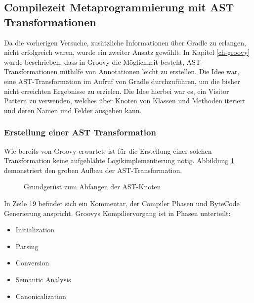 
\subsection{Compilezeit Metaprogrammierung mit AST Transformationen}
Da die vorherigen Versuche, zusätzliche Informationen über Gradle zu erlangen, nicht erfolgreich waren, wurde ein zweiter Ansatz gewählt. 
In Kapitel \ref{ch-groovy} wurde beschrieben, dass in Groovy die Möglichkeit besteht, AST-Transformationen mithilfe von Annotationen leicht zu erstellen. 
Die Idee war, eine AST-Transformation im Aufruf von Gradle durchzuführen, um die bisher nicht erreichten Ergebnisse zu erzielen. 
Die Idee hierbei war es, ein Visitor Pattern zu verwenden, welches über Knoten von Klassen und Methoden iteriert und deren Namen und Felder ausgeben kann. 


\subsubsection{Erstellung einer AST Transformation}
Wie bereits von Groovy erwartet, ist für die Erstellung einer solchen Transformation keine aufgeblähte Logikimplementierung nötig. 
Abbildung  \ref{fig:GlobalAst-visit} demonstriert den groben Aufbau der AST-Transformation.


\begin{figure}[hbt!]
	
	\caption{Grundgerüst zum Abfangen der AST-Knoten}
	\label{fig:GlobalAst-visit}
\end{figure}


%
%	

In Zeile 19 befindet sich ein Kommentar, der Compiler Phasen und ByteCode Generierung anspricht. Groovys Kompiliervorgang ist in Phasen unterteilt:

\begin{itemize}[nosep]
	\item Initialization
	\item Parsing
	\item Conversion
	\item Semantic Analysis
	\item Canonicalization
\end{itemize}

